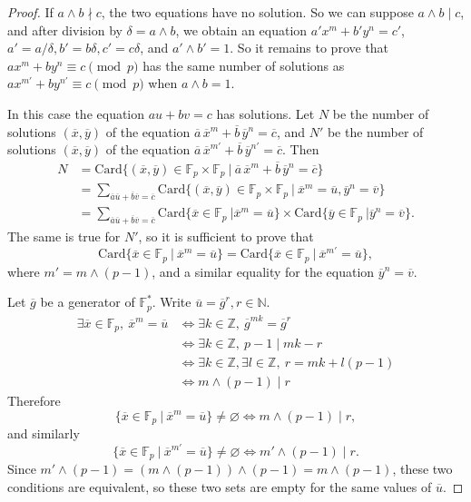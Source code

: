 \documentclass[11pt,a4paper]{article}
\newcommand{\Z}{\mathbb{Z}}
\newcommand{\N}{\mathbb{N}}
\newcommand{\F}{\mathbb{F}}
\begin{document}
\begin{proof}
If $a\wedge b \nmid c$, the two equations have no solution. So we can suppose $a\wedge b \mid c$, and after division by $\delta = a\wedge b$, we obtain an equation $a'x^m+b'y^n = c'$, $a' = a/\delta,b' = b\delta,c'=c\delta$, and $a' \wedge b' = 1$. So it remains to prove that $a x^m + b y^n \equiv c \pmod p$ has the same number of solutions as $a x^{m'} + b y^{n'} \equiv c \pmod p$ when $a\wedge b = 1$.

In this case the equation $au + bv=c$ has solutions. Let $N$ be the number of solutions $(\overline{x},\overline{y})$  of the equation $\overline{a}\, \overline{x}^m + \overline{b}\,  \overline{y}^n = \overline{c}$, and $N'$ be the number of solutions $(\overline{x},\overline{y})$  of the equation $\overline{a}\, \overline{x}^{m'} + \overline{b}\,  \overline{y}^{n' }= \overline{c}$. Then 
\begin{align*}
N &= \mathrm{Card} \{(\overline{x},\overline{y}) \in \F_p\times \F_p\ \vert\  \overline{a}\, \overline{x}^m + \overline{b}\,  \overline{y}^n = \overline{c}\}\\
&=\sum_{\overline{a}\overline{u}+\overline{b} \overline{v}=\overline{c}} \mathrm{Card} \{(\overline{x},\overline{y}) \in \F_p\times \F_p\ \vert\  \overline{x}^m = \overline{u} ,\overline{y}^n = \overline{v}\}\\
&= \sum_{\overline{a}\overline{u}+\overline{b} \overline{v}=\overline{c}} \mathrm{Card}\{\overline{x} \in \F_p\ \vert \overline{x}^m = \overline{u}\} \times \mathrm{Card}\{\overline{y} \in \F_p\ \vert \overline{y}^n = \overline{v}\}.
\end{align*}
The same is true for $N'$, so it is sufficient to prove that
$$\mathrm{Card}\{\overline{x} \in \F_p\ \vert\  \overline{x}^m  = \overline{u}\} = \mathrm{Card}\{\overline{x} \in \F_p\ \vert \ \overline{x}^{m'} = \overline{u}\},$$ 
where $m' = m \wedge (p-1)$, and a similar equality for the equation $\overline{y}^n = \overline{v}$.

Let $\overline{g}$ be a generator of $\F_p^*$. Write $\overline{u} = \overline{g}^r , r \in \N$.
\begin{align*}
\exists \overline{x} \in \F_p,\ \overline{x}^m = \overline{u} &\iff \exists k \in \Z, \ \overline{g}^{mk} = \overline{g}^r\\
&\iff \exists k \in \Z,\ p-1 \mid mk -r\\
&\iff \exists k \in \Z, \exists l \in \Z,\ r = mk + l (p-1)\\
&\iff m \wedge (p-1) \mid r
\end{align*}
Therefore $$\{\overline{x} \in \F_p\ \vert\  \overline{x}^m  = \overline{u}\} \ne \varnothing \iff m\wedge (p-1) \mid r,$$ and similarly $$\{\overline{x} \in \F_p\ \vert\  \overline{x}^{m'}  = \overline{u}\} \ne \varnothing \iff m' \wedge (p-1) \mid r.$$ 
Since $m' \wedge (p-1) = (m\wedge (p-1)) \wedge (p-1) = m \wedge (p-1)$, these two conditions are equivalent, so these two sets are empty for the same values of $\overline{u}$.


\end{proof}
\end{document}
